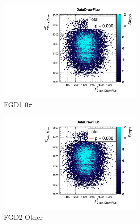 \begin{figure}[h]
	\begin{subfigure}[t]{\textwidth}
	\begin{subfigure}[t]{0.32\textwidth}
		\includegraphics[width=\textwidth, trim={20mm 6mm 4mm 11mm}, clip,page=7]{figures/mach3/2018/data/2018a_FixedCov_FullCov_Mpi_Data_merge_PostPredStore_SampLLH_procs}
		\caption*{FGD1 0$\pi$}
	\end{subfigure}
\begin{subfigure}[t]{0.32\textwidth}
	\includegraphics[width=\textwidth, trim={20mm 6mm 4mm 11mm}, clip,page=52]{figures/mach3/2018/data/2018a_FixedCov_FullCov_Mpi_Data_merge_PostPredStore_SampLLH_procs}
	\caption*{FGD2 Other}
\end{subfigure}
\begin{subfigure}[t]{0.32\textwidth}

\end{subfigure}
\end{subfigure}
\end{figure}
